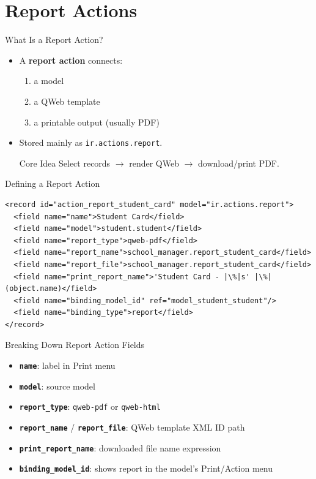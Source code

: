 \section{Report Actions}

\begin{frame}[fragile]{What Is a Report Action?}
	\begin{itemize}
		\item A \textbf{report action} connects:
		\begin{enumerate}
			\item a model
			\item a QWeb template
			\item a printable output (usually PDF)
		\end{enumerate}
		\item Stored mainly as \texttt{ir.actions.report}.
\begin{block}{Core Idea}
	Select records $\rightarrow$ render QWeb $\rightarrow$ download/print PDF.
\end{block}
	\end{itemize}
\end{frame}

\begin{frame}[fragile]{Defining a Report Action}
\begin{lstlisting}[style=xml,escapeinside=||]
<record id="action_report_student_card" model="ir.actions.report">
  <field name="name">Student Card</field>
  <field name="model">student.student</field>
  <field name="report_type">qweb-pdf</field>
  <field name="report_name">school_manager.report_student_card</field>
  <field name="report_file">school_manager.report_student_card</field>
  <field name="print_report_name">'Student Card - |\%|s' |\%| (object.name)</field>
  <field name="binding_model_id" ref="model_student_student"/>
  <field name="binding_type">report</field>
</record>
\end{lstlisting}
\end{frame}

\begin{frame}[fragile]{Breaking Down Report Action Fields}
	\begin{itemize}
		\item \textbf{\texttt{name}}: label in Print menu
		\item \textbf{\texttt{model}}: source model
		\item \textbf{\texttt{report\_type}}: \texttt{qweb-pdf} or \texttt{qweb-html}
		\item \textbf{\texttt{report\_name}} / \textbf{\texttt{report\_file}}: QWeb template XML ID path
		\item \textbf{\texttt{print\_report\_name}}: downloaded file name expression
		\item \textbf{\texttt{binding\_model\_id}}: shows report in the model's Print/Action menu
	\end{itemize}
\end{frame}

